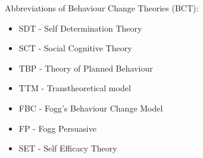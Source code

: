 Abbreviations of Behaviour Change Theories (BCT):

\begin{itemize}
	\item SDT - Self Determination Theory \cite{Deci:1985km}
	\item SCT - Social Cognitive Theory \cite{bandura1977self}
	\item TBP - Theory of Planned Behaviour \cite{ajzen1991theory}
	\item TTM - Transtheoretical model \cite{Prochaska:1982jn}
	\item FBC - Fogg's Behaviour Change Model \cite{fogg2009behavior}
	\item FP - Fogg Persuasive \cite{fogg2002persuasive}
	\item SET - Self Efficacy Theory \cite{bandura1977self}
\end{itemize}


